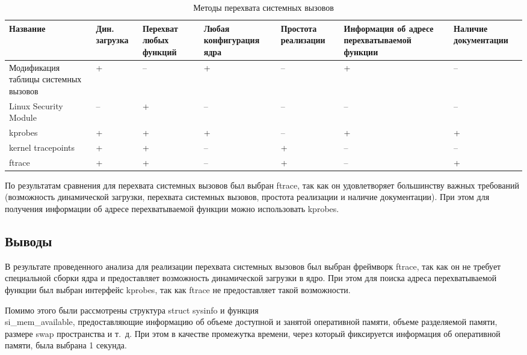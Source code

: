 \begin{table}[h]
	\centering
	\captionsetup{justification=centering}
	\caption{\label{tab:analyze} Методы перехвата системных вызовов}
	\begin{tabular}{ | p{2cm} | p{2cm} | p{2cm} | p{2cm} | p{2cm} | p{2cm} | p{2cm} | }
		\hline
		Название & Дин. загрузка & Перехват любых функций & Любая конфигурация ядра & Простота реализации & Информация об адресе перехватываемой функции & Наличие документации \\
		\hline
		Модификация таблицы системных вызовов & + & -- & + & -- & + & -- \\
		\hline
		Linux Security Module & -- & + & -- & -- & -- & -- \\
		\hline
		kprobes & + & + & + & -- & + & + \\
		\hline
		kernel tracepoints & + & + & -- & + & -- & -- \\
		\hline
		ftrace & + & + & -- & + & -- & + \\
		\hline
	\end{tabular}
\end{table}

По результатам сравнения для перехвата системных вызовов был выбран ftrace, так как он удовлетворяет большинству важных требований (возможность динамической загрузки, перехвата системных вызовов, простота реализации и наличие документации). При этом для получения информации об адресе перехватываемой функции можно использовать kprobes.

\subsection*{Выводы}

В результате проведенного анализа для реализации перехвата системных вызовов был выбран фреймворк ftrace, так как он не требует специальной сборки ядра и предоставляет возможность динамической загрузки в ядро. При этом для поиска адреса перехватываемой функции был выбран интерфейс kprobes, так как ftrace не предоставляет такой возможности.

Помимо этого были рассмотрены структура struct sysinfo и функция\\ si\_mem\_available, предоставляющие информацию об объеме доступной и занятой оперативной памяти, объеме разделяемой памяти, размере swap пространства и т.~д. При этом в качестве промежутка времени, через который фиксируется информация об оперативной памяти, была выбрана 1 секунда.


